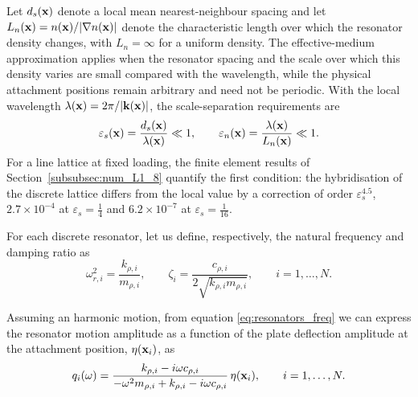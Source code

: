 Let $d_s(\mathbf{x})$ denote a local mean nearest-neighbour spacing and let $L_n(\mathbf{x})=n(\mathbf{x})/\lvert\nabla n(\mathbf{x})\rvert$ denote the characteristic length over which the resonator density changes, with $L_n=\infty$ for a uniform density. The effective-medium approximation applies when the resonator spacing and the scale over which this density varies are small compared with the wavelength, while the physical attachment positions remain arbitrary and need not be periodic. With the local wavelength $\lambda(\mathbf{x})=2\pi/\lvert\mathbf{k}(\mathbf{x})\rvert$, the scale-separation requirements are
\begin{equation}\label{eq:homogenization_scale_separation}
    \varepsilon_s(\mathbf{x})=\frac{d_s(\mathbf{x})}{\lambda(\mathbf{x})}\ll 1,
    \qquad
    \varepsilon_n(\mathbf{x})=\frac{\lambda(\mathbf{x})}{L_n(\mathbf{x})}\ll 1.
\end{equation}
{\color{red}For a line lattice at fixed loading, the finite element results of Section~\ref{subsubsec:num_L1_8} quantify the first condition: the hybridisation of the discrete lattice differs from the local value by a correction of order $\varepsilon_s^{4.5}$, $2.7\times10^{-4}$ at $\varepsilon_s=\tfrac14$ and $6.2\times10^{-7}$ at $\varepsilon_s=\tfrac1{16}$.}

For each discrete resonator, let us define, respectively, the natural frequency and damping ratio as
\begin{equation}\label{eq:resonator_natural_freq_damping}
    \omega_{r,i}^2=\frac{k_{\rho,i}}{m_{\rho,i}},
    \qquad\zeta_i=\frac{c_{\rho,i}}{2\sqrt{k_{\rho,i}m_{\rho,i}}},
    \qquad i=1,\ldots,N.
\end{equation}

Assuming an harmonic motion, from equation \eqref{eq:resonators_freq} we can express the resonator motion amplitude as a function of the plate deflection amplitude at the attachment position, $\eta(\mathbf{x}_i)$, as
\begin{equation}\label{eq:resonator_motion}
    q_i(\omega)=\frac{k_{\rho,i}-i\omega c_{\rho,i}}{-\omega^2m_{\rho,i}+k_{\rho,i}-i\omega c_{\rho,i}}\,\eta(\mathbf{x}_i),
    \qquad i=1,\ldots,N.
\end{equation}

